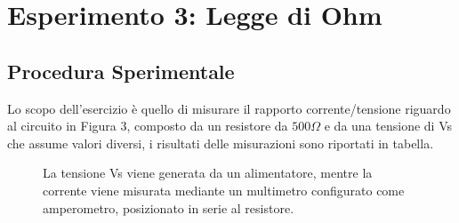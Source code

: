 \section{Esperimento 3: Legge di Ohm}
\subsection{Procedura Sperimentale}
Lo scopo dell’esercizio è quello di misurare il rapporto corrente/tensione riguardo al circuito in Figura 3, composto da un resistore da $500\Omega$ e da una tensione di Vs che assume valori diversi, i risultati delle misurazioni sono riportati in tabella.
\begin{figure}[h]
\begin{minipage}[t]{0.5\textwidth} %
\vspace{0pt}
    \raggedright %
    La tensione Vs viene generata da un alimentatore, mentre la corrente viene misurata mediante un multimetro configurato come amperometro, posizionato in serie al resistore. 
\end{minipage}%
\hspace{0.05\textwidth} %
\begin{minipage}[t]{0.15\textwidth} %
\vspace{0pt}
    \centering
    \caption{}
    \label{fig:circuito}
\end{minipage}
\end{figure} 

